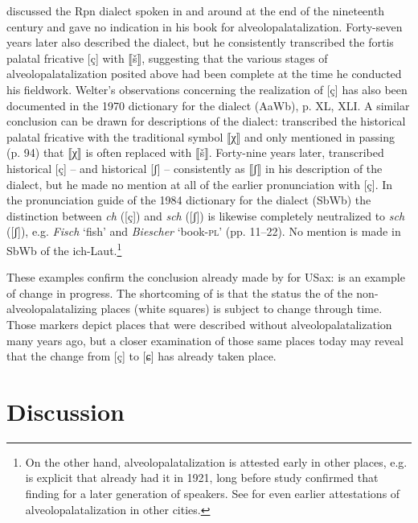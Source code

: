 \begin{xlist}
\citet{Jardon1891} discussed the Rpn dialect spoken in and around  at the end of the nineteenth century and gave no indication in his book for alveolopalatalization. Forty-seven years later \citet{Welter1938} also described the  dialect, but he consistently transcribed the fortis palatal fricative [ç] with ⟦š⟧, suggesting that the various stages of alveolopalatalization posited above had been complete at the time he conducted his fieldwork. Welter’s observations concerning the realization of [ç] has also been documented in the 1970 dictionary for the  dialect (AaWb), p. XL, XLI. A similar conclusion can be drawn for descriptions of the  dialect: \citet{Kuntze1932} transcribed the historical palatal fricative with the traditional symbol ⟦χ⟧ and only mentioned in passing (p. 94) that ⟦χ⟧ is often replaced with ⟦š⟧. Forty-nine years later, \citet{Steitz1981} transcribed historical [ç] -- and historical [ʃ] -- consistently as ⟦ʃ⟧ in his description of the  dialect, but he made no mention at all of the earlier pronunciation with [ç]. In the pronunciation guide of the 1984 dictionary for the  dialect (SbWb) the distinction between \textit{ch} ([ç]) and \textit{sch} ([ʃ]) is likewise completely neutralized to \textit{sch} ([ʃ]), e.g. \textit{Fisch} ‘fish’ and \textit{Biescher} ‘book-\textsc{pl}’ (pp. 11--22). No mention is made in SbWb of the ich-Laut.\footnote{On the other hand, alveolopalatalization is attested early in other places, e.g. \citet[11]{Rauh1921} is explicit that  already had it in 1921, long before  study confirmed that finding for a later generation of speakers. See  for even earlier attestations of alveolopalatalization in other cities.}\pagebreak

\begin{sloppypar}
These examples confirm the conclusion already made by \citet{Große1957} for USax:  is an example of change in progress. The shortcoming of  is that the status the of the non-alveolopalatalizing places (white squares) is subject to change through time. Those markers depict places that were described without alveolopalatalization many years ago, but a closer examination of those same places today may reveal that the change from [ç]  to [ɕ] has already taken place.
\end{sloppypar}

\section{Discussion}\label{sec:10.6}


\end{xlist}
